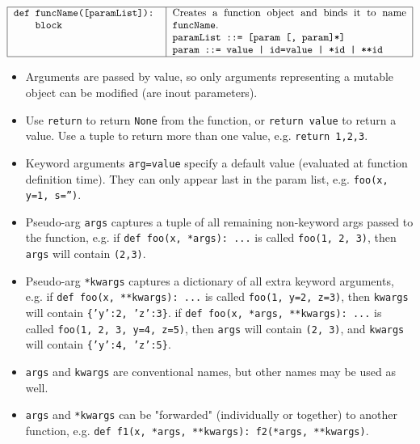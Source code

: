 {\footnotesize
$$\begin{tabular}{|p{5cm}|p{8cm}|}
\hline
\tt def funcName([paramList]):\newline \mbox{}\ \ \ \ block & 
	Creates a function object and binds it to name {\tt funcName}.\newline
	{\tt paramList ::= [param [, param]*]}\newline
	{\tt param ::= value | id=value | *id | **id}\\
\hline
\end{tabular}$$
}

\noindent\begin{itemize}
\item Arguments are passed by value, so only arguments representing a mutable object can be modified (are inout parameters).
\item Use {\tt return} to return {\tt None} from the function, or {\tt return value} to return a value. 
	Use a tuple to return more than one value, e.g. {\tt return 1,2,3}.
\item Keyword arguments {\tt arg=value} specify a default value (evaluated at function definition time). 
	They can only appear last in the param list, e.g. {\tt foo(x, y=1, s='')}.
\item Pseudo-arg {\tt *args} captures a tuple of all remaining non-keyword args passed to the function, 
	e.g. if {\tt def foo(x, *args): ...} is called {\tt foo(1, 2, 3)}, then {\tt args} will contain {\tt (2,3)}.
\item Pseudo-arg {\tt **kwargs} captures a dictionary of all extra keyword arguments, 
	e.g. if {\tt def foo(x, **kwargs): ...} is called {\tt foo(1, y=2, z=3)}, then {\tt kwargs} will contain {\tt \{'y':2, 'z':3\}}. 
	if {\tt def foo(x, *args, **kwargs): ...} is called {\tt foo(1, 2, 3, y=4, z=5)}, then {\tt args} will contain {\tt (2, 3)}, 
	and {\tt kwargs} will contain {\tt \{'y':4, 'z':5\}}.
\item {\tt args} and {\tt kwargs} are conventional names, but other names may be used as well.
\item {\tt *args} and {\tt **kwargs} can be "forwarded" (individually or together) to another function, e.g.
      {\tt def f1(x, *args, **kwargs): f2(*args, **kwargs)}.
\end{itemize}




